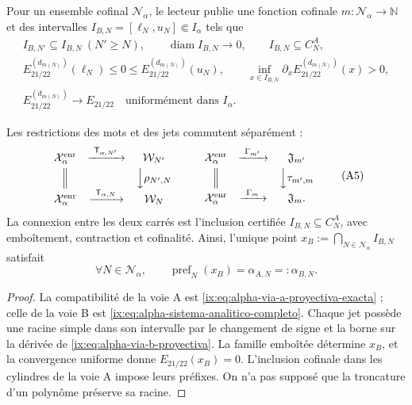 Pour un ensemble cofinal \(\mathcal N_\alpha\), le lecteur publie une fonction
cofinale \(m:\mathcal N_\alpha\to\mathbb N\) et des intervalles
\(I_{B,N}=[\ell_N,u_N]\Subset I_\alpha\) tels que
\begin{equation}
\begin{gathered}
 I_{B,N'}\subseteq I_{B,N}\ (N'\ge N),\qquad
 \operatorname{diam}I_{B,N}\longrightarrow0,\qquad
 I_{B,N}\subseteq C_N^A,\\
 E_{21/22}^{(d_{m(N)})}(\ell_N)\le0\le
 E_{21/22}^{(d_{m(N)})}(u_N),\qquad
 \inf_{x\in I_{B,N}}\partial_xE_{21/22}^{(d_{m(N)})}(x)>0,\\
 E_{21/22}^{(d_{m(N)})}\longrightarrow E_{21/22}
 \quad\text{uniformément dans }I_\alpha .
\end{gathered}
 \tag{A4}
 \label{ix:eq:alpha-via-b-proyectiva}
\end{equation}

\begin{proposition}
\label{ix:prop:alpha-cuadrados-compatibilidad}
Les restrictions des mots et des jets commutent séparément :
\[
\begin{array}{ccc}
 \mathcal X_\alpha^{\mathrm{enr}}&
 \xrightarrow{\ \mathsf T_{\alpha,N'}\ }&\mathcal W_{N'}\\[1mm]
 \Big\Vert&&\Big\downarrow\rho_{N',N}\\[1mm]
 \mathcal X_\alpha^{\mathrm{enr}}&
 \xrightarrow{\ \mathsf T_{\alpha,N}\ }&\mathcal W_N
\end{array}
\qquad
\begin{array}{ccc}
 \mathcal X_\alpha^{\mathrm{enr}}&
 \xrightarrow{\ \Gamma_{m'}\ }&\mathfrak J_{m'}\\[1mm]
 \Big\Vert&&\Big\downarrow\tau_{m',m}\\[1mm]
 \mathcal X_\alpha^{\mathrm{enr}}&
 \xrightarrow{\ \Gamma_m\ }&\mathfrak J_m .
\end{array}
 \tag{A5}
\]
La connexion entre les deux carrés est l'inclusion certifiée \(I_{B,N}\subseteq C_N^A\), avec emboîtement, contraction et cofinalité. Ainsi, l'unique point \(x_B:=\bigcap_{N\in\mathcal N_\alpha}I_{B,N}\) satisfait
\begin{equation}
 \forall N\in\mathcal N_\alpha,\qquad
 \operatorname{pref}_N(x_B)=\alpha_{A,N}=:\alpha_{B,N}.
 \tag{A6}
 \label{ix:eq:alpha-igualdad-cada-nivel}
\end{equation}
\end{proposition}

\begin{proof}
La compatibilité de la voie A est
\eqref{ix:eq:alpha-via-a-proyectiva-exacta} ; celle de la voie B est
\eqref{ix:eq:alpha-sistema-analitico-completo}. Chaque jet possède une racine simple
dans son intervalle par le changement de signe et la borne sur la dérivée de
\eqref{ix:eq:alpha-via-b-proyectiva}. La famille emboîtée détermine \(x_B\), et la
convergence uniforme donne \(E_{21/22}(x_B)=0\). L'inclusion cofinale dans les
cylindres de la voie A impose leurs préfixes. On n'a pas supposé que la troncature d'un
polynôme préserve sa racine.
\end{proof}

